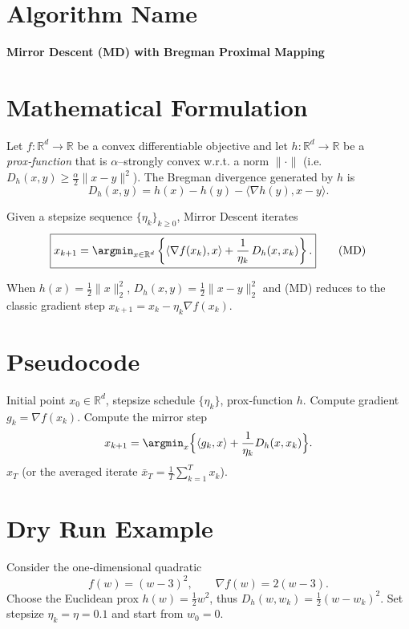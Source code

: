 \documentclass{article}
\newcommand{\inner}[2]{\langle #1,#2\rangle}
\newcommand{\grad}{\nabla}
\newcommand{\D}[2]{D_{h}(#1,#2)}
\begin{document}
\section*{Algorithm Name}
\textbf{Mirror Descent (MD) with Bregman Proximal Mapping}

\section*{Mathematical Formulation}
Let $f:\mathbb{R}^{d}\rightarrow\mathbb{R}$ be a convex differentiable objective and let
$h:\mathbb{R}^{d}\rightarrow\mathbb{R}$ be a \emph{prox‑function} that is
$\alpha$–strongly convex w.r.t. a norm $\|\cdot\|$ (i.e. $D_{h}(x,y)\ge\frac{\alpha}{2}\|x-y\|^{2}$).
The Bregman divergence generated by $h$ is
\[
\D{x}{y}=h(x)-h(y)-\inner{\grad h(y)}{x-y}.
\]

Given a stepsize sequence $\{\eta_{k}\}_{k\ge0}$, Mirror Descent iterates
\[
\boxed{
x_{k+1}= \argmin_{x\in\mathbb{R}^{d}}
\left\{ \inner{\grad f(x_{k})}{x}+ \frac{1}{\eta_{k}}\,\D{x}{x_{k}}\right\}.
}
\tag{MD}
\]

When $h(x)=\tfrac{1}{2}\|x\|_{2}^{2}$, $\D{x}{y}=\tfrac12\|x-y\|_{2}^{2}$ and (MD) reduces to the classic gradient step
$x_{k+1}=x_{k}-\eta_{k}\grad f(x_{k})$.

\section*{Pseudocode}
\begin{algorithm}[H]
\caption{Mirror Descent}
\begin{algorithmic}[1]
\REQUIRE Initial point $x_{0}\in\mathbb{R}^{d}$, stepsize schedule $\{\eta_{k}\}$, prox‑function $h$.
    \STATE Compute gradient $g_{k}= \grad f(x_{k})$.
    \STATE Compute the mirror step
    \[
    x_{k+1}= \argmin_{x}\Big\{ \inner{g_{k}}{x}+ \frac{1}{\eta_{k}}\D{x}{x_{k}}\Big\}.
    \]
\ENDFOR
\RETURN $x_{T}$ (or the averaged iterate $\bar x_{T}=\tfrac1T\sum_{k=1}^{T}x_{k}$).
\end{algorithmic}
\end{algorithm}

\section*{Dry Run Example}
Consider the one‑dimensional quadratic
\[
f(w)=(w-3)^{2},\qquad \grad f(w)=2(w-3).
\]
Choose the Euclidean prox $h(w)=\tfrac12 w^{2}$, thus $\D{w}{w_{k}}=\tfrac12 (w-w_{k})^{2}$.
Set stepsize $\eta_{k}= \eta=0.1$ and start from $w_{0}=0$.
\end{document}
